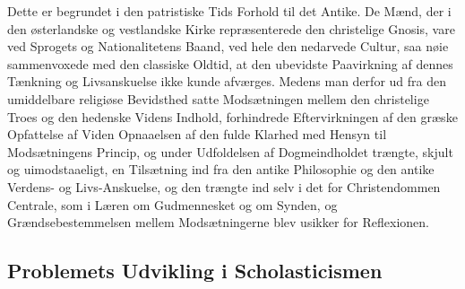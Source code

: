 \documentclass[12pt,a4paper]{book}
\newcommand{\opage}[1]{\marginnote{\footnotesize\textit{[#1]}}}
\begin{document}
Dette er begrundet i den patristiske Tids Forhold til det Antike. De Mænd, der i den
østerlandske og vestlandske Kirke repræsenterede den christelige Gnosis, vare ved
Sprogets og Nationalitetens Baand, ved hele den nedarvede Cultur, saa nøie
sammenvoxede med den classiske Oldtid, at den ubevidste Paavirkning af dennes
Tænkning og Livsanskuelse ikke kunde afværges. Medens man derfor ud fra den
umiddelbare religiøse Bevidsthed satte Modsætningen mellem den christelige Troes
og den hedenske Videns \opage{18}Indhold, forhindrede Eftervirkningen af den græske
Opfattelse af Viden Opnaaelsen af den fulde Klarhed med Hensyn til Modsætningens
Princip, og under Udfoldelsen af Dogmeindholdet trængte, skjult og
uimodstaaeligt, en Tilsætning ind fra den antike Philosophie og den antike
Verdens- og Livs-Anskuelse, og den trængte ind selv i det for Christendommen
Centrale, som i Læren om Gudmennesket og om Synden, og Grændsebestemmelsen mellem
Modsætningerne blev usikker for Reflexionen.

\subsection{Problemets Udvikling i Scholasticismen}
\label{ssec:scholasticismen}
\end{document}
